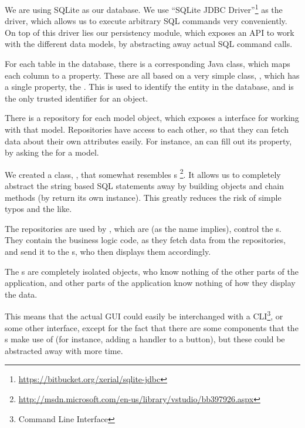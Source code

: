 We are using SQLite as our database. We use ``SQLite JDBC Driver''\footnote{\url{https://bitbucket.org/xerial/sqlite-jdbc}} as the driver, which allows us to execute arbitrary SQL commands very conveniently. On top of this driver lies our persistency module, which exposes an API to work with the different data models, by abstracting away actual SQL command calls.

For each table in the database, there is a corresponding Java class, which maps each column to a property. These are all based on a very simple class, , which has a single property, the . This is used to identify the entity in the database, and is the only trusted identifier for an object. 

There is a repository for each model object, which exposes a  interface for working with that model. Repositories have access to each other, so that they can fetch data about their own attributes easily. For instance, an  can fill out its  property, by asking the  for a  model.

We created a class, , that somewhat resembles s \footnote{\url{http://msdn.microsoft.com/en-us/library/vstudio/bb397926.aspx}}. It allows us to completely abstract the string based SQL statements away by building  objects and chain methods (by return its own instance). This greatly reduces the risk of simple typos and the like.

The repositories are used by , which are (as the name implies), control the s. They contain the business logic code, as they fetch data from the repositories, and send it to the s, who then displays them accordingly. 

The s are completely isolated objects, who know nothing of the other parts of the application, and other parts of the application know nothing of how they display the data. 

This means that the actual GUI could easily be interchanged with a CLI\footnote{Command Line Interface}, or some other interface, except for the fact that there are some  components that the s make use of (for instance, adding a handler to a button), but these could be abstracted away with more time.